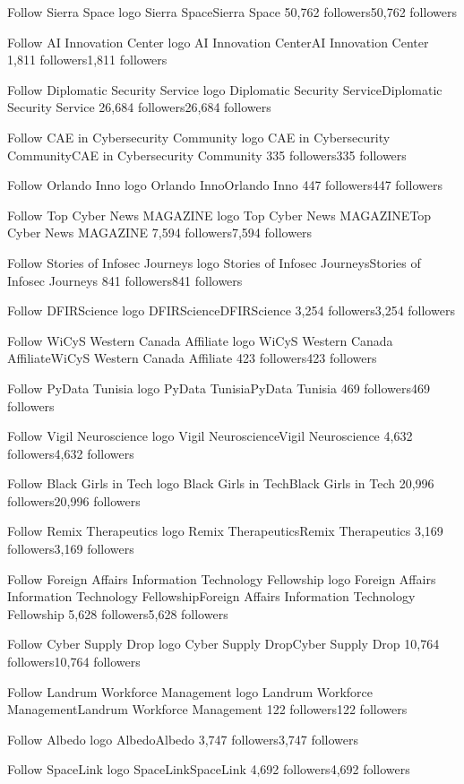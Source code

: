 Follow
Sierra Space logo
Sierra SpaceSierra Space
50,762 followers50,762 followers

Follow
AI Innovation Center logo
AI Innovation CenterAI Innovation Center
1,811 followers1,811 followers

Follow
Diplomatic Security Service logo
Diplomatic Security ServiceDiplomatic Security Service
26,684 followers26,684 followers

Follow
CAE in Cybersecurity Community logo
CAE in Cybersecurity CommunityCAE in Cybersecurity Community
335 followers335 followers

Follow
Orlando Inno logo
Orlando InnoOrlando Inno
447 followers447 followers

Follow
Top Cyber News MAGAZINE logo
Top Cyber News MAGAZINETop Cyber News MAGAZINE
7,594 followers7,594 followers

Follow
Stories of Infosec Journeys logo
Stories of Infosec JourneysStories of Infosec Journeys
841 followers841 followers

Follow
DFIRScience logo
DFIRScienceDFIRScience
3,254 followers3,254 followers

Follow
WiCyS Western Canada Affiliate logo
WiCyS Western Canada AffiliateWiCyS Western Canada Affiliate
423 followers423 followers

Follow
PyData Tunisia logo
PyData TunisiaPyData Tunisia
469 followers469 followers

Follow
Vigil Neuroscience logo
Vigil NeuroscienceVigil Neuroscience
4,632 followers4,632 followers

Follow
Black Girls in Tech logo
Black Girls in TechBlack Girls in Tech
20,996 followers20,996 followers

Follow
Remix Therapeutics logo
Remix TherapeuticsRemix Therapeutics
3,169 followers3,169 followers

Follow
Foreign Affairs Information Technology Fellowship logo
Foreign Affairs Information Technology FellowshipForeign Affairs Information Technology Fellowship
5,628 followers5,628 followers

Follow
Cyber Supply Drop logo
Cyber Supply DropCyber Supply Drop
10,764 followers10,764 followers

Follow
Landrum Workforce Management logo
Landrum Workforce ManagementLandrum Workforce Management
122 followers122 followers

Follow
Albedo logo
AlbedoAlbedo
3,747 followers3,747 followers

Follow
SpaceLink logo
SpaceLinkSpaceLink
4,692 followers4,692 followers

